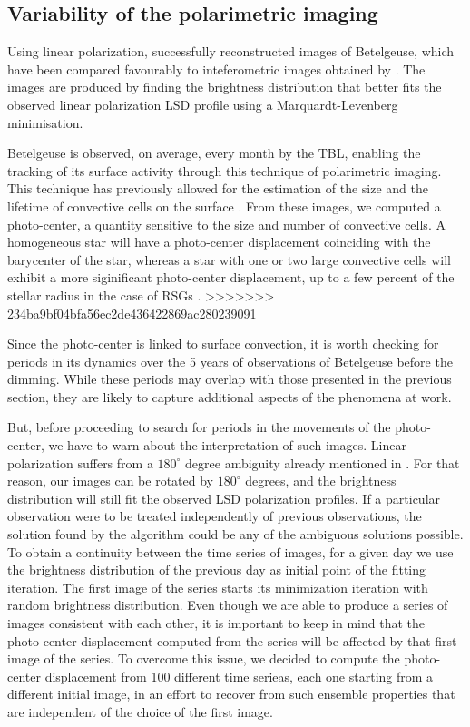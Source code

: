 \documentclass{aa}
\begin{document}
\subsection{Variability of the polarimetric imaging}

Using linear polarization, \cite{lopez_ariste_convective_2018} successfully reconstructed images of Betelgeuse, which have been compared favourably to inteferometric images obtained by \cite{montarges_close_2016}. The images are produced by finding the brightness distribution that better fits the observed linear 
polarization LSD profile using a Marquardt-Levenberg minimisation.

Betelgeuse is observed, on average, every month by the TBL, enabling the tracking of its surface activity through this technique of polarimetric imaging. This technique has previously allowed for the estimation of  the size and the
 lifetime of convective cells on the surface \citep{lopez_ariste_convective_2018}. From these images, we computed a photo-center, a quantity sensitive to the size and number of convective cells. 
A homogeneous star will have a photo-center displacement coinciding with the barycenter of the star, whereas a star with one or two large convective cells will exhibit a more siginificant photo-center displacement, up to a few percent of the stellar radius in the case of RSGs \citep{chiavassa_probing_2022}. 
>>>>>>> 234ba9bf04bfa56ec2de436422869ac280239091

Since the photo-center is linked to surface convection, it is worth checking for periods in its 
dynamics over the 5 years of observations of Betelgeuse before the dimming. While these periods may overlap with those presented in the previous section, they are likely to capture additional aspects of the phenomena at work.

But, before proceeding to search for periods in the movements of the photo-center, we have to warn about the interpretation of such images. 
Linear polarization suffers from a $180 ^\circ$ degree ambiguity already mentioned in \cite{auriere_discovery_2016}. For that reason, our 
images can be rotated by $180^\circ$ degrees, and the brightness distribution will still fit the observed LSD polarization profiles. 
If a particular observation were to be treated independently of previous observations, the solution found by 
the algorithm could be any of the ambiguous solutions possible. To obtain a continuity 
between the time series of images, for a given day we use the brightness distribution of the previous day as initial point 
of the  fitting iteration. The first image of the series  starts its minimization iteration with 
random brightness distribution. 
Even though we are able to produce a series of images  consistent with each other, it is important 
to keep in mind that the photo-center displacement computed from the series 
will be affected by that first image of the series. 
To overcome this issue, we decided to compute
the photo-center displacement from 100 different time serieas, each one starting from a different initial image, in an effort to recover 
from such ensemble
properties that are independent of the choice of the first image. 
\end{document}
